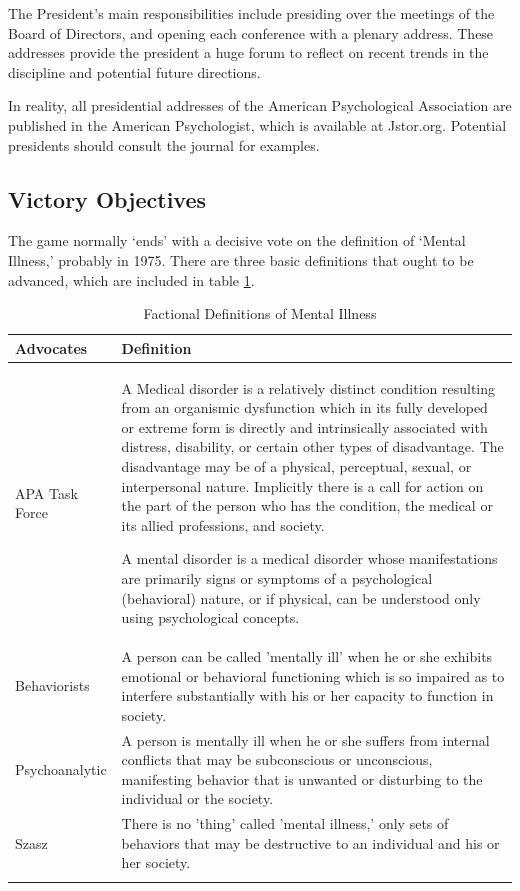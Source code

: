 The President's main responsibilities include presiding over the meetings of the Board of Directors, and opening each conference with a plenary address. These addresses provide the president a huge forum to reflect on recent trends in the discipline and potential future directions.

In reality, all presidential addresses of the American Psychological Association are published in the American Psychologist, which is available at Jstor.org. Potential presidents should consult the journal for examples.

\subsection{Victory Objectives}
\label{victoryobjectives}

The game normally `ends' with a decisive vote on the definition of `Mental Illness,' probably in 1975. There are three basic definitions that ought to be advanced, which are included in table \ref{table: definitions}.
 \begin{longtable}[!t]{ | p{2cm} | p{12cm} | }
\hline

\textbf{Advocates}&\textbf{Definition}\\ \hline
APA Task Force&A Medical disorder is a relatively distinct condition resulting from an organismic dysfunction which in its fully developed or extreme form is directly and intrinsically associated with distress, disability, or certain other types of disadvantage. The disadvantage may be of a physical, perceptual, sexual, or interpersonal nature. Implicitly there is a call for action on the part of the person who has the condition, the medical or its allied professions, and society.

A mental disorder is a medical disorder whose manifestations are primarily signs or symptoms of a psychological (behavioral) nature, or if physical, can be understood only using psychological concepts.\\ \hline
Behaviorists& A person can be called 'mentally ill' when he or she exhibits emotional or behavioral functioning which is so impaired as to interfere substantially with his or her capacity to function in society. \\ \hline
Psychoanalytic&A person is mentally ill when he or she suffers from internal conflicts that may be subconscious or unconscious, manifesting behavior that is unwanted or disturbing to the individual or the society. \\ \hline
Szasz&There is no 'thing' called 'mental illness,' only sets of behaviors that may be destructive to an individual and his or her society. \\ \hline
 
\caption{Factional Definitions of Mental Illness}
\label{table: definitions}
\end{longtable}

